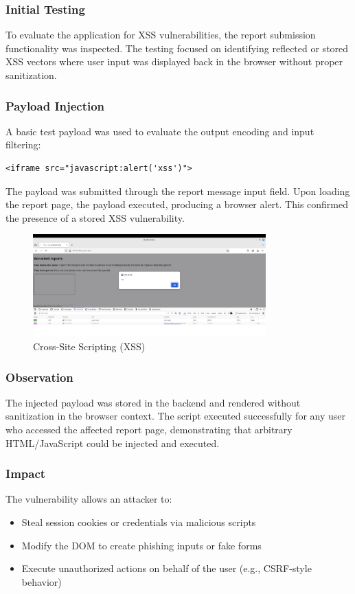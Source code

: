 \documentclass[12pt]{article}
\begin{document}
\subsubsection{Initial Testing}
To evaluate the application for XSS vulnerabilities, the report submission functionality was inspected. The testing focused on identifying reflected or stored XSS vectors where user input was displayed back in the browser without proper sanitization.

\subsubsection{Payload Injection}
A basic test payload was used to evaluate the output encoding and input filtering\cite{juice-shop}:

\begin{verbatim}
<iframe src="javascript:alert('xss')">
\end{verbatim}

The payload was submitted through the report message input field. Upon loading the report page, the payload executed, producing a browser alert. This confirmed the presence of a stored XSS vulnerability.

\begin{figure}[h!]
\centering
\includegraphics[width=0.8\textwidth]{PT8.png}
\caption{Cross-Site Scripting (XSS)}
\label{fig:sql_injection}
\end{figure}

\FloatBarrier

\subsubsection{Observation}
The injected payload was stored in the backend and rendered without sanitization in the browser context. The script executed successfully for any user who accessed the affected report page, demonstrating that arbitrary HTML/JavaScript could be injected and executed.

\subsubsection{Impact}
The vulnerability allows an attacker to:
\begin{itemize}
    \item Steal session cookies or credentials via malicious scripts
    \item Modify the DOM to create phishing inputs or fake forms
    \item Execute unauthorized actions on behalf of the user (e.g., CSRF-style behavior)
\end{itemize}
\end{document}

